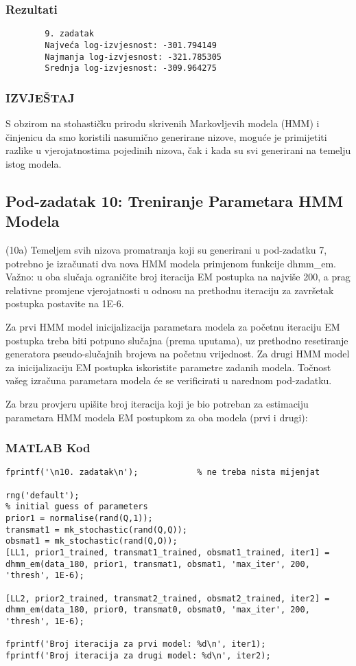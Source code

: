 \documentclass[12pt]{article}
\begin{document}
	\subsubsection*{Rezultati}
	\begin{verbatim}
		9. zadatak
		Najveća log-izvjesnost: -301.794149
		Najmanja log-izvjesnost: -321.785305
		Srednja log-izvjesnost: -309.964275
	\end{verbatim}
	
	\subsubsection*{IZVJEŠTAJ}
	S obzirom na stohastičku prirodu skrivenih Markovljevih modela (HMM) i činjenicu da smo koristili nasumično generirane nizove, moguće je primijetiti razlike u vjerojatnostima pojedinih nizova, čak i kada su svi generirani na temelju istog modela.
	
	\subsection{Pod-zadatak 10: Treniranje Parametara HMM Modela}
	(10a) Temeljem svih nizova promatranja koji su generirani u pod-zadatku 7, potrebno je izračunati dva nova HMM modela primjenom funkcije dhmm\_em. Važno: u oba slučaja ograničite broj iteracija EM postupka na najviše 200, a prag relativne promjene vjerojatnosti u odnosu na prethodnu iteraciju za završetak postupka postavite na 1E-6.
	
	Za prvi HMM model inicijalizacija parametara modela za početnu iteraciju EM postupka treba biti potpuno slučajna (prema uputama), uz prethodno resetiranje generatora pseudo-slučajnih brojeva na početnu vrijednost. Za drugi HMM model za inicijalizaciju EM postupka iskoristite parametre zadanih modela. Točnost vašeg izračuna parametara modela će se verificirati u narednom pod-zadatku.
	
	Za brzu provjeru upišite broj iteracija koji je bio potreban za estimaciju parametara HMM modela EM postupkom za oba modela (prvi i drugi):
	
	\subsubsection*{MATLAB Kod}
	\begin{lstlisting}
fprintf('\n10. zadatak\n');            % ne treba nista mijenjat

rng('default');
% initial guess of parameters
prior1 = normalise(rand(Q,1));
transmat1 = mk_stochastic(rand(Q,Q));
obsmat1 = mk_stochastic(rand(Q,O));
[LL1, prior1_trained, transmat1_trained, obsmat1_trained, iter1] = dhmm_em(data_180, prior1, transmat1, obsmat1, 'max_iter', 200, 'thresh', 1E-6);

[LL2, prior2_trained, transmat2_trained, obsmat2_trained, iter2] = dhmm_em(data_180, prior0, transmat0, obsmat0, 'max_iter', 200, 'thresh', 1E-6);

fprintf('Broj iteracija za prvi model: %d\n', iter1);
fprintf('Broj iteracija za drugi model: %d\n', iter2);
	\end{lstlisting}
	
\end{document}
